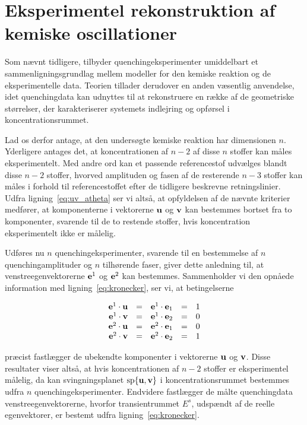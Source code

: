 \section{Eksperimentel rekonstruktion af kemiske oscillationer}
Som n{\ae}vnt tidligere, tilbyder
quenching\-eksperi\-menter umiddelbart et
sam\-men\-lig\-ningsgrundlag mellem model\-ler for den
kemiske reaktion og de eksperimentelle data. Teorien
tillader derudover en anden v{\ae}sentlig anvendelse, idet
quenchingdata kan udnyttes til at rekonstruere en r{\ae}kke
af de geo\-metriske st{\o}rrelser, der karakteriserer
systemets indlejring og opf{\o}rsel i
kon\-cen\-tra\-tions\-rummet.

\vspace{4.0mm}
Lad os derfor antage, at den unders{\o}gte kemiske reaktion
har dimensionen $n$. Yderligere antages det, at
koncentrationen af $n-2$ af disse $n$ stoffer kan m{\aa}les
eksperimentelt. Med andre ord kan et passende referencestof
udv{\ae}lges blandt disse $n-2$ stoffer, hvorved amplituden
og fasen af de resterende $n-3$ stoffer kan m{\aa}les i
forhold til referencestoffet efter de tidligere beskrevne
retningslinier. Udfra lig\-ning~\ref{eq:uv_atheta} ser vi
alts{\aa}, at opfyldelsen af de n{\ae}vnte kriterier
medf{\o}rer, at komponenterne i vektorerne ${\bf u}$ og
${\bf v}$ kan bestemmes bortset fra to komponenter,
svarende til de to restende stoffer, hvis koncentration
eksperimentelt ikke er m{\aa}lelig.

\vspace{4.0mm}
Udf{\o}res nu $n$ quenchingeksperimenter, svarende til en
bestemmelse af $n$ quen\-ching\-amplituder og $n$
tilh{\o}rende faser, giver dette anledning til, at
venstreegenvektorerne ${\bf e}^1$ og ${\bf e}^2$ kan
bestemmes. Sammenholder vi den opn{\aa}ede information med
lig\-ning~\ref{eq:kronecker}, ser vi, at betingelserne

\begin{equation}
 \begin{array}{rcrcl}
  {\bf e}^1 \cdot {\bf u} & = & {\bf e}^1 \cdot {\bf e}_1 & = & 1\\
  {\bf e}^1 \cdot {\bf v} & = & {\bf e}^1 \cdot {\bf e}_2 & = & 0\\
  {\bf e}^2 \cdot {\bf u} & = & {\bf e}^2 \cdot {\bf e}_1 & = & 0\\
  {\bf e}^2 \cdot {\bf v} & = & {\bf e}^2 \cdot {\bf e}_2 & = & 1
 \end{array}
 \label{eq:uvdet}
\end{equation}

pr{\ae}cist fastl{\ae}gger de ubekendte komponenter i
vektorerne ${\bf u}$ og ${\bf v}$. Disse resultater viser
alts{\aa}, at hvis koncentrationen af $n-2$ stoffer er
eksperimentel m{\aa}lelig, da kan sving\-ningsplanet ${\rm
sp}\{{\bf u},{\bf v}\}$ i koncentrationsrummet bestemmes
udfra $n$ quenchingeksperimenter. Endvidere fastl{\ae}gger
de m{\aa}lte quenchingdata venstreegenvektorerne, hvorfor
transientrummet $E^s$, udsp{\ae}ndt af de reelle
egenvektorer, er bestemt udfra
lig\-ning~\ref{eq:kronecker}.

